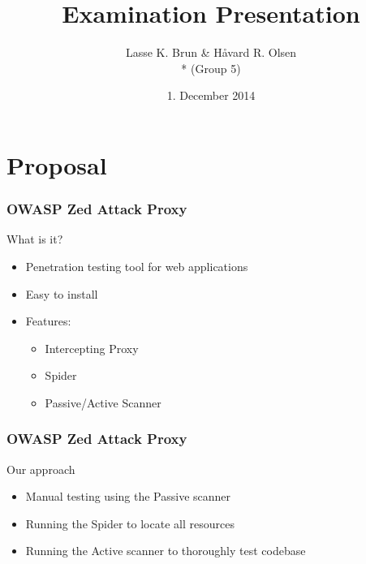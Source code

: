\documentclass[12pt,norsk]{beamer}
\title[Examination Presentation]{Examination Presentation}
\author{Lasse K. Brun \& Håvard R. Olsen \\* (Group 5)} %
\institute[UiB]
{
\medskip
\textit{lkbrun@gmail.com \& haavard.olsen@live.com} \\* %
\textit{INF226 - Software Security, Fall 2014 }
}
\date{1. December 2014} %
\begin{document}
 

\begin{frame}
\titlepage %
\end{frame}


\section{Proposal}





\begin{frame}
	\frametitle{OWASP Zed Attack Proxy}
	
	\begin{block}{What is it?}
	
		\begin{itemize}
			\item Penetration testing tool for web applications
			\item Easy to install
			\item Features:
		
			\begin{itemize}
				\item Intercepting Proxy
				\item Spider
				\item Passive/Active Scanner
			\end{itemize}
		
		\end{itemize}
	
	\end{block}
	
\end{frame}

\begin{frame}
	\frametitle{OWASP Zed Attack Proxy}
	
	\begin{block}{Our approach}
	
		\begin{itemize}
			\item Manual testing using the Passive scanner
			\item Running the Spider to locate all resources
			\item Running the Active scanner to thoroughly test codebase
		\end{itemize}	
	
	\end{block}
	
\end{frame}
\end{document}
